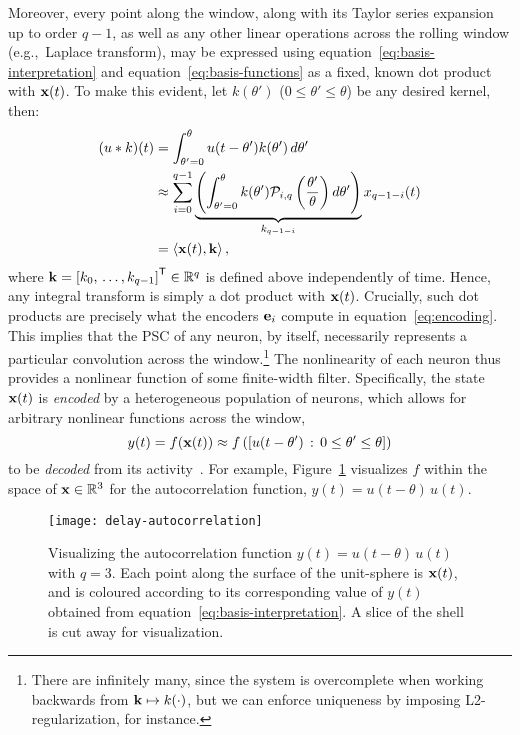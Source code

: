 Moreover, every point along the window, along with its Taylor series expansion up to order $q-1$, as well as any other linear operations across the rolling window (e.g.,~Laplace transform), may be expressed using equation~\ref{eq:basis-interpretation} and equation~\ref{eq:basis-functions} as a fixed, known dot product with $\mathbf{x}(t)$.
To make this evident, let $k(\theta')$ ($0 \le \theta' \le \theta$) be any desired kernel, then:
\begin{equation} \label{eq:delay-linear-transform}
\begin{aligned}
(u \ast k)(t) &= \int_{\theta'=0}^{\theta} u(t - \theta') k(\theta') \, d\theta' \\
&\approx \sum_{i=0}^{q-1} \underbrace{\left( \int_{\theta'=0}^{\theta} k(\theta') \mathcal{P}_{i,q} \left(\frac{\theta'}{\theta} \right) d\theta' \right)}_{k_{q -1-i}} x_{q-1-i}(t) \\
&= \left\langle \mathbf{x}(t)\text{,}\, \mathbf{k} \right\rangle \text{,}
\end{aligned}
\end{equation}
where $\mathbf{k} = {\left[ k_0\text{,}\, \ldots \text{,}\, k_{q-1} \right]}^\mathsf{T} \in \mathbb{R}^q$ is defined above independently of time.
Hence, any integral transform is simply a dot product with $\mathbf{x}(t)$.
Crucially, such dot products are precisely what the encoders $\mathbf{e}_i$ compute in equation~\ref{eq:encoding}.
This implies that the PSC of any neuron, by itself, necessarily represents a particular convolution across the window.\footnote{%
There are infinitely many, since the system is overcomplete when working backwards from $\mathbf{k} \mapsto k(\cdot)$, but we can enforce uniqueness by imposing L2-regularization, for instance.}
The nonlinearity of each neuron thus provides a nonlinear function of some finite-width filter.
Specifically, the state $\mathbf{x}(t)$ is \emph{encoded} by a heterogeneous population of neurons, which allows for arbitrary nonlinear functions across the window,
$$y(t) = f(\mathbf{x}(t)) \approx f\left(\left[ u(t - \theta') \,:\, 0 \le \theta' \le \theta \right]\right)$$
to be \emph{decoded} from its activity~\citep{eliasmith2003a}.
For example, Figure~\ref{fig:delay-autocorrelation} visualizes $f$ within the space of $\mathbf{x} \in \mathbb{R}^3$ for the autocorrelation function, $y(t) = u(t - \theta)\, u(t)$.

\begin{figure}
\centering
  \texttt{[image: delay-autocorrelation]}
  \caption{ \label{fig:delay-autocorrelation} 
    Visualizing the autocorrelation function $y(t) = u(t - \theta)\, u(t)$ with $q=3$.
    Each point along the surface of the unit-sphere is $\mathbf{x}(t)$, and is coloured according to its corresponding value of $y(t)$ obtained from equation~\ref{eq:basis-interpretation}.
    A slice of the shell is cut away for visualization.
  } 
\end{figure}

